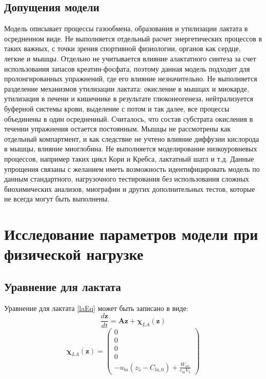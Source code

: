 \subsection{Допущения модели}
Модель описывает процессы газообмена, образования и утилизации лактата в осредненном виде. Не выполняется отдельный расчет энергетических процессов в таких важных, с точки зрения спортивной физиологии, органов как сердце, легкие и мышцы. Отдельно не учитывается влияние алактатного синтеза за счет использования запасов креатин-фосфата, поэтому данная модель подходит для пролонгированных упражнений, где его влияние незначительно. Не выполняется разделение механизмов утилизации лактата: окисление в мышцах и миокарде, утилизация в печени и кишечнике в результате глюконеогенеза, нейтрализуется буферной системы крови, выделение с потом и так далее, все процессы объединены в один осредненный. Считалось, что состав субстрата окисления в течении упражнения остается постоянным. Мышцы не рассмотрены как отдельный компартмент, и как следствие не учтено влияние диффузии кислорода в мышцы, влияние миоглобина. Не выполняется моделирование низкоуровневых процессов, например таких цикл Кори и Кребса, лактатный шатл и т.д. Данные упрощения связаны с желанием иметь возможность идентифицировать модель по данным стандартного, нагрузочного тестирования без использования сложных биохимических анализов, миографии и других дополнительных тестов, которые не всегда могут быть выполнены.

\section{Исследование параметров модели при физической нагрузке}
\subsection{Уравнение для лактата}
\label{stabLa}
Уравнение для лактата \eqref{laEq} может быть записано в виде:
\begin{equation}
\frac{d\textbf{z}}{dt}=\textbf{A}\textbf{z}+\mathbf{\chi}_{LA}(\textbf{z})
\end{equation}
\begin{equation}
\mathbf{\chi}_{LA}(\textbf{z})=\begin{pmatrix}
0 \\
0 \\
0 \\
0 \\
\displaystyle -u_{la}(z_{5}-C_{la,0})+\frac{W_{an}}{e_{la}V_{5}}
\end{pmatrix}
\end{equation}

